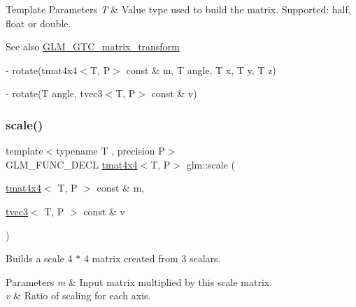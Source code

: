 \begin{DoxyTemplParams}{Template Parameters}
{\em T} & Value type used to build the matrix. Supported\+: half, float or double. \\
\hline
\end{DoxyTemplParams}
\begin{DoxySeeAlso}{See also}
\hyperlink{group__gtc__matrix__transform}{G\+L\+M\+\_\+\+G\+T\+C\+\_\+matrix\+\_\+transform} 

-\/ rotate(tmat4x4$<$\+T, P$>$ const \& m, T angle, T x, T y, T z) 

-\/ rotate(\+T angle, tvec3$<$\+T, P$>$ const \& v) 
\end{DoxySeeAlso}
\mbox{\label{group__gtc__matrix__transform_ga8f062fcc07e2445500793f2803afebb0}} 
\subsubsection{\texorpdfstring{scale()}{scale()}}
{\footnotesize\ttfamily template$<$typename T , precision P$>$ \\
G\+L\+M\+\_\+\+F\+U\+N\+C\+\_\+\+D\+E\+CL \hyperlink{structglm_1_1tmat4x4}{tmat4x4}$<$T, P$>$ glm\+::scale (\begin{DoxyParamCaption}\item[{\hyperlink{structglm_1_1tmat4x4}{tmat4x4}$<$ T, P $>$ const \&}]{m,  }\item[{\hyperlink{structglm_1_1tvec3}{tvec3}$<$ T, P $>$ const \&}]{v }\end{DoxyParamCaption})}

Builds a scale 4 $\ast$ 4 matrix created from 3 scalars.


\begin{DoxyParams}{Parameters}
{\em m} & Input matrix multiplied by this scale matrix. \\
\hline
{\em v} & Ratio of scaling for each axis. \\
\hline
\end{DoxyParams}

